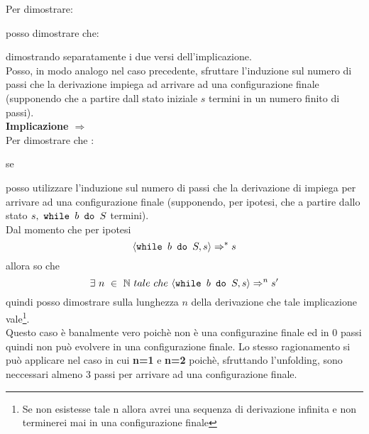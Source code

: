 {
	Per dimostrare:
	\begin{center}
	\exFour{}
	\end{center}
	posso dimostrare che:
	\begin{center}
	\exFourIff{}
	\end{center}
	dimostrando separatamente i due versi dell'implicazione. \\
	
	Posso, in modo analogo nel caso precedente, sfruttare l'induzione sul
	numero di passi che la derivazione \exFourRS{} impiega ad arrivare ad una
	configurazione finale (supponendo che a partire dall stato iniziale $s$
	termini in un numero finito di passi).\\
		
	\textbf{Implicazione $\Longrightarrow{}$} \\
	Per dimostrare che :
	\begin{center}
	se \exFourLtR{}
	\end{center}
	posso utilizzare l'induzione sul numero di passi che la derivazione di 
	 impiega per arrivare ad una configurazione finale 
	(supponendo, per ipotesi, che a partire dallo stato $s,~\mbox{\normalfont{\texttt{while }}} b \textrm{\normalfont{\texttt{ do }}} S$
	termini).\\
	
	Dal momento che per ipotesi \[ \langle{}\mbox{\normalfont{\texttt{while }}} b \textrm{\normalfont{\texttt{ do }}} S, s\rangle{}\Rightarrow^{*}s \] allora so che 
	\[ \exists{}~n~\in~\mathbb{N}~tale~che~\langle{}\mbox{\normalfont{\texttt{while }}} b \textrm{\normalfont{\texttt{ do }}} S, s\rangle{}\Rightarrow^{n}s'  \]quindi
	posso dimostrare sulla lunghezza $n$ della derivazione che tale
	implicazione vale\footnote{Se non esistesse tale n allora avrei una sequenza di derivazione infinita e non terminerei mai in una configurazione finale}.\\
	
	 Questo caso è banalmente vero poichè 
	 non è una configurazine finale ed in 0 passi quindi
	non può evolvere in una configurazione finale. Lo stesso ragionamento si
	può applicare nel caso in cui \textbf{n=1} e \textbf{n=2} poichè,
	sfruttando l'unfolding, sono neccessari almeno 3 passi per arrivare ad una
	configurazione finale.\\
	
}
